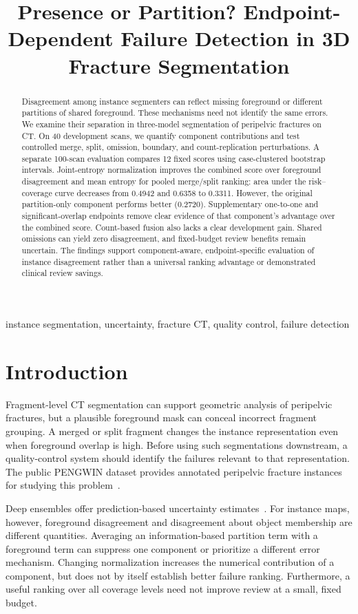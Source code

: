 \documentclass[conference]{IEEEtran}
\title{Presence or Partition? Endpoint-Dependent Failure Detection in 3D Fracture Segmentation}
\author{\IEEEauthorblockN{Anonymous authors}}
\begin{document}
\maketitle
\begin{abstract}
Disagreement among instance segmenters can reflect missing foreground or different partitions of shared foreground. These mechanisms need not identify the same errors. We examine their separation in three-model segmentation of peripelvic fractures on CT. On 40 development scans, we quantify component contributions and test controlled merge, split, omission, boundary, and count-replication perturbations. A separate 100-scan evaluation compares 12 fixed scores using case-clustered bootstrap intervals. Joint-entropy normalization improves the combined score over foreground disagreement and mean entropy for pooled merge/split ranking: area under the risk--coverage curve decreases from 0.4942 and 0.6358 to 0.3311. However, the original partition-only component performs better (0.2720). Supplementary one-to-one and significant-overlap endpoints remove clear evidence of that component's advantage over the combined score. Count-based fusion also lacks a clear development gain. Shared omissions can yield zero disagreement, and fixed-budget review benefits remain uncertain. The findings support component-aware, endpoint-specific evaluation of instance disagreement rather than a universal ranking advantage or demonstrated clinical review savings.
\end{abstract}
\begin{IEEEkeywords}
instance segmentation, uncertainty, fracture CT, quality control, failure detection
\end{IEEEkeywords}

\section{Introduction}
Fragment-level CT segmentation can support geometric analysis of peripelvic fractures, but a plausible foreground mask can conceal incorrect fragment grouping. A merged or split fragment changes the instance representation even when foreground overlap is high. Before using such segmentations downstream, a quality-control system should identify the failures relevant to that representation. The public PENGWIN dataset provides annotated peripelvic fracture instances for studying this problem~\cite{pengwin2026}.

Deep ensembles offer prediction-based uncertainty estimates~\cite{lakshminarayanan2017}. For instance maps, however, foreground disagreement and disagreement about object membership are different quantities. Averaging an information-based partition term with a foreground term can suppress one component or prioritize a different error mechanism. Changing normalization increases the numerical contribution of a component, but does not by itself establish better failure ranking. Furthermore, a useful ranking over all coverage levels need not improve review at a small, fixed budget.
\end{document}
